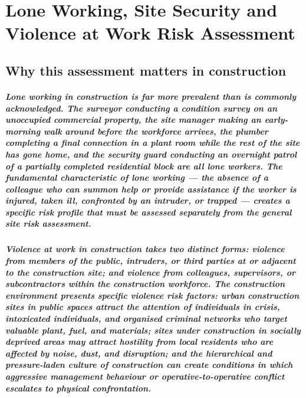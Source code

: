 \chapter{Lone Working, Site Security and Violence at Work Risk Assessment}
\label{chap:Lone Working, Site Security and Violence at Work Risk Assessment}

\section{Why this assessment matters in construction}

\paragraph{Lone working in construction is far more prevalent than is commonly acknowledged. The surveyor conducting a condition survey on an unoccupied commercial property, the site manager making an early-morning walk around before the workforce arrives, the plumber completing a final connection in a plant room while the rest of the site has gone home, and the security guard conducting an overnight patrol of a partially completed residential block are all lone workers. The fundamental characteristic of lone working --- the absence of a colleague who can summon help or provide assistance if the worker is injured, taken ill, confronted by an intruder, or trapped --- creates a specific risk profile that must be assessed separately from the general site risk assessment.}

\paragraph{Violence at work in construction takes two distinct forms: violence from members of the public, intruders, or third parties at or adjacent to the construction site; and violence from colleagues, supervisors, or subcontractors within the construction workforce. The construction environment presents specific violence risk factors: urban construction sites in public spaces attract the attention of individuals in crisis, intoxicated individuals, and organised criminal networks who target valuable plant, fuel, and materials; sites under construction in socially deprived areas may attract hostility from local residents who are affected by noise, dust, and disruption; and the hierarchical and pressure-laden culture of construction can create conditions in which aggressive management behaviour or operative-to-operative conflict escalates to physical confrontation.}

